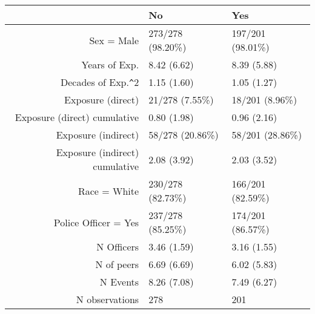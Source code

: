 \begin{table}[ht]
\centering
\begin{tabular}{rll}
  \toprule
 & No & Yes \\ 
  \midrule
Sex = Male & 273/278 (98.20\%) & 197/201 (98.01\%) \\ 
  Years of Exp. & 8.42 (6.62) & 8.39 (5.88) \\ 
  Decades of Exp.\verb|^|2 & 1.15 (1.60) & 1.05 (1.27) \\ 
  Exposure (direct) & 21/278 (7.55\%) & 18/201 (8.96\%) \\ 
  Exposure (direct) cumulative & 0.80 (1.98) & 0.96 (2.16) \\ 
  Exposure (indirect) & 58/278 (20.86\%) & 58/201 (28.86\%) \\ 
  Exposure (indirect) cumulative & 2.08 (3.92) & 2.03 (3.52) \\ 
  Race = White & 230/278 (82.73\%) & 166/201 (82.59\%) \\ 
  Police Officer = Yes & 237/278 (85.25\%) & 174/201 (86.57\%) \\ 
  N Officers & 3.46 (1.59) & 3.16 (1.55) \\ 
  N of peers & 6.69 (6.69) & 6.02 (5.83) \\ 
  N Events & 8.26 (7.08) & 7.49 (6.27) \\ 
  N observations & 278 & 201 \\ 
   \bottomrule
\end{tabular}
\end{table}
